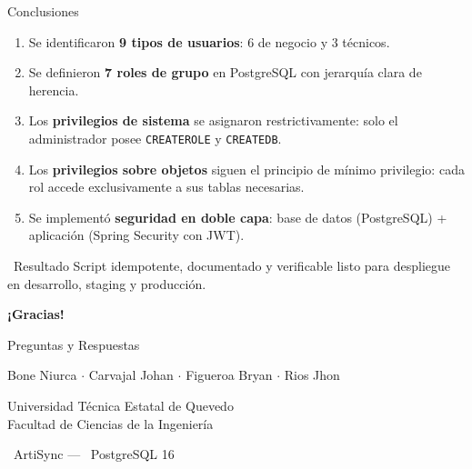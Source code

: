 \documentclass[aspectratio=169]{beamer}
\begin{document}
\begin{frame}{Conclusiones}
    \begin{enumerate}
        \item[\faUsers] Se identificaron \textbf{9 tipos de usuarios}: 6 de negocio y 3 técnicos.

        \vspace{0.2cm}
        \item[\faLayerGroup] Se definieron \textbf{7 roles de grupo} en PostgreSQL con jerarquía clara de herencia.

        \vspace{0.2cm}
        \item[\faCog] Los \textbf{privilegios de sistema} se asignaron restrictivamente: solo el administrador posee \texttt{CREATEROLE} y \texttt{CREATEDB}.

        \vspace{0.2cm}
        \item[\faLock] Los \textbf{privilegios sobre objetos} siguen el principio de mínimo privilegio: cada rol accede exclusivamente a sus tablas necesarias.

        \vspace{0.2cm}
        \item[\faShieldAlt] Se implementó \textbf{seguridad en doble capa}: base de datos (PostgreSQL) + aplicación (Spring Security con JWT).
    \end{enumerate}

    \vspace{0.3cm}
    \begin{exampleblock}{\faCheckCircle\ Resultado}
        \centering Script idempotente, documentado y verificable listo para despliegue en desarrollo, staging y producción.
    \end{exampleblock}
\end{frame}

\begin{frame}
    \centering
    \vspace{1.5cm}
    {\Huge\bfseries\textcolor{uteqgreen}{¡Gracias!}}

    \vspace{0.8cm}
    {\Large Preguntas y Respuestas}

    \vspace{1cm}
    \small
    Bone Niurca $\cdot$ Carvajal Johan $\cdot$ Figueroa Bryan $\cdot$ Rios Jhon

    \vspace{0.3cm}
    \scriptsize
    Universidad Técnica Estatal de Quevedo\\
    Facultad de Ciencias de la Ingeniería

    \vspace{0.5cm}
    \faGithub\ ArtiSync --- \faDatabase\ PostgreSQL 16
\end{frame}
\end{document}
